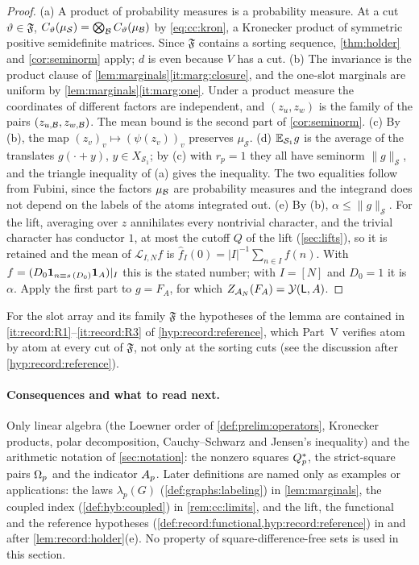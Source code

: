 \begin{proof}
(a) A product of probability measures is a probability measure. At a cut
$\vartheta\in\mathfrak F$, $C_\vartheta(\mu_{\mathcal S})=\bigotimes_\mathcal B C_\vartheta(\mu_\mathcal B)$
by \eqref{eq:cc:kron}, a Kronecker product of symmetric positive semidefinite
matrices. Since $\mathfrak F$ contains a sorting sequence, \cref{thm:holder}
and \cref{cor:seminorm} apply; $d$ is even because $V$ has a cut.
(b) The invariance is the product clause of
\cref{lem:marginals}\ref{it:marg:closure}, and the one-slot marginals are
uniform by \cref{lem:marginals}\ref{it:marg:one}. Under a product measure the
coordinates of different factors are independent, and $(z_u,z_w)$ is the
family of the pairs $(z_{u,\mathcal B},z_{w,\mathcal B})$. The mean bound is the second
part of \cref{cor:seminorm}.
(c) By (b), the map $(z_v)_v\mapsto(\psi(z_v))_v$ preserves $\mu_{\mathcal S}$.
(d) $\mathbb E_{\mathcal S_1}g$ is the average of the translates $g(\cdot+y)$,
$y\in X_{\mathcal S_1}$; by (c) with $r_p=1$ they all have seminorm
$\|g\|_{\mathcal S}$, and the triangle inequality of (a) gives the inequality.
The two equalities follow from Fubini, since the factors $\mu_\mathcal B$ are
probability measures and the integrand does not depend on the labels of the
atoms integrated out.
(e) By (b), $\alpha\le\|g\|_{\mathcal S}$. For the lift, averaging over $z$
annihilates every nontrivial character, and the trivial character
has conductor $1$, at most the cutoff $Q$ of the lift
(\cref{sec:lifts}), so it is retained and the mean of
$\mathcal L_{I,N}f$ is
$\widehat f_I(0)=|I|^{-1}\sum_{n\in I}f(n)$. With
$f=(D_0\mathbf 1_{n\equiv s\,(D_0)}\mathbf 1_A)|_I$ this is the stated number; with
$I=[N]$ and $D_0=1$ it is $\alpha$. Apply the first part to $g=F_A$, for which
$Z_{\mathcal A_N}(F_A)=\mathcal Y(\mathsf L,A)$.
\end{proof}

For the slot array and its family $\mathfrak F$ the hypotheses of the lemma
are contained in \ref{it:record:R1}--\ref{it:record:R3} of
\cref{hyp:record:reference}, which Part~V verifies atom by atom at every cut of
$\mathfrak F$, not only at the sorting cuts (see the discussion after
\cref{hyp:record:reference}).

\paragraph{Consequences and what to read next.}
Only linear algebra (the Loewner order of \cref{def:prelim:operators},
Kronecker products, polar decomposition, Cauchy--Schwarz and Jensen's
inequality) and the arithmetic notation of \cref{sec:notation}: the nonzero
squares $Q_{p}^{*}$, the strict-square pairs $\Omega_{p}$ and the indicator $A_{p}$. Later
definitions are named only as examples or applications: the laws
$\lambda_p(G)$ (\cref{def:graphs:labeling}) in \cref{lem:marginals}, the
coupled index (\cref{def:hyb:coupled}) in \cref{rem:cc:limits}, and the lift,
the functional and the reference hypotheses
(\cref{def:record:functional,hyp:record:reference}) in and after
\cref{lem:record:holder}(e). No property of square-difference-free sets is
used in this section.
